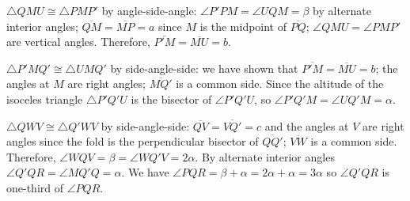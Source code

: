 $\triangle QMU\cong \triangle PMP'$ by angle-side-angle:  $\angle P'PM=\angle UQM=\beta$ by alternate interior angles; $\overline{QM}=\overline{MP}=a$ since $M$ is the midpoint of $\overline{PQ}$; $\angle QMU=\angle PMP'$ are vertical angles. Therefore, $\overline{P'M}=\overline{MU}=b$.

$\triangle P'MQ'\cong \triangle UMQ'$ by side-angle-side: we have shown that $\overline{P'M}=\overline{MU}=b$; the angles at $M$ are right angles; $\overline{MQ'}$ is a common side. Since the altitude of the isoceles triangle $\triangle P'Q'U$ is the bisector of $\angle P'Q'U$, so $\angle P'Q'M=\angle UQ'M=\alpha$.

$\triangle QWV\cong\triangle Q'WV$ by side-angle-side: $\overline{QV}=\overline{VQ'}=c$ and the angles at $V$ are right angles since the fold is the perpendicular bisector of $\overline{QQ'}$; $\overline{VW}$ is a common side. Therefore, $\angle WQV=\beta=\angle WQ'V=2\alpha$. By alternate interior angles $\angle Q'QR=\angle MQ'Q=\alpha$. We have $\angle PQR = \beta + \alpha = 2\alpha+\alpha=3\alpha$ so $\angle Q'QR$ is one-third of $\angle PQR$.
